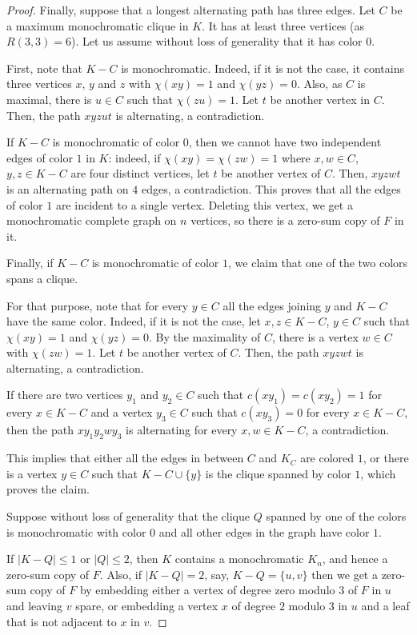 \documentclass[11pt]{article}
\begin{document}
\begin{proof}
    Finally, suppose that a longest alternating path has three edges. Let $C$ be a maximum monochromatic clique in $K$. It has at least three vertices (as $R(3,3)=6$). Let us assume without loss of generality that it has color $0$. 

    First, note that $K-C$ is monochromatic. Indeed, if it is not the case, it contains three vertices $x$, $y$ and $z$ with $\chi(xy)=1$ and $\chi(yz)=0$. Also, as $C$ is maximal, there is $u \in C$ such that $\chi(zu)=1$. Let $t$ be another vertex in $C$. Then, the path $xyzut$ is alternating, a contradiction.

    If $K-C$ is monochromatic of color $0$, then we cannot have two independent edges of color $1$ in $K$: indeed, if $\chi(xy)=\chi(zw)=1$ where $x, w \in C$, $y, z \in K-C$ are four distinct vertices, let $t$ be another vertex of $C$. Then, $xyzwt$ is an alternating path on $4$ edges, a contradiction. This proves that all the edges of color $1$ are incident to a single vertex. Deleting this vertex, we get a monochromatic complete graph on $n$ vertices, so there is a zero-sum copy of $F$ in it.

    Finally, if $K-C$ is monochromatic of color $1$, we claim that one of the two colors spans a clique.
    
    
    For that purpose, note that for every $y \in C$ all the edges joining $y$ and $K-C$ have the same color. Indeed, if it is not the case, let $x, z \in K-C$, $y \in C$ such that $\chi(xy)=1$ and $\chi(yz)=0$. By the maximality of $C$, there is a vertex $w \in C$ with $\chi(zw)=1$. Let $t$ be another vertex of $C$. Then, the path $xyzwt$ is alternating, a contradiction.

    If there are two vertices $y_1$ and $y_2 \in C$ such that $c(xy_1)=c(xy_2)=1$ for every $x \in K-C$ and a vertex $y_3 \in C$ such that $c(xy_3)=0$ for every $x \in K-C$, then the path $xy_1y_2wy_3$ is alternating for every $x, w \in K-C$, a contradiction.

    This implies that either all the edges in between $C$ and $K_C$ are colored $1$, or there is a vertex $y \in C$ such that $K-C\cup \{y \}$ is the clique spanned by color $1$, which proves the claim.

    Suppose without loss of generality that the clique $Q$ spanned by one of the colors is monochromatic with color $0$ and all other edges in the graph have color $1$.

    If  $|K-Q| \leq 1$ or $|Q| \leq 2$, then $K$ contains a monochromatic $K_n$, and hence a zero-sum copy of $F$. Also, if $|K-Q|=2$, say, $K-Q = \{u,v\}$ then we get a zero-sum copy of $F$ by embedding either a vertex of degree zero modulo $3$ of $F$ in $u$ and leaving $v$ spare, or embedding a vertex $x$ of degree $2$ modulo $3$ in $u$ and a leaf that is not adjacent to $x$ in $v$.


\end{proof}
\end{document}
